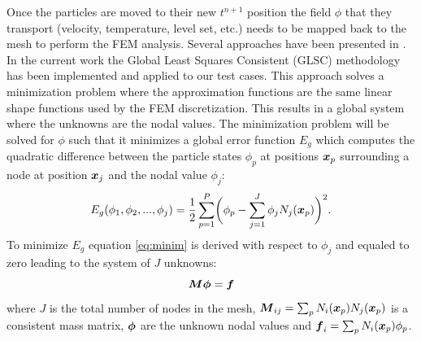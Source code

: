 Once the particles are moved to their new $t^{n+1}$ position the field $\phi$ that they transport (velocity, temperature, level set, etc.) needs to be mapped back to the mesh to perform the FEM analysis. Several approaches have been presented in \cite{gimenez:tesis}. In the current work the Global Least Squares Consistent (GLSC) methodology has been implemented and applied to our test cases. This approach solves a minimization problem where the approximation functions are the same linear shape functions used by the FEM discretization. This results in a global system where the unknowns are the nodal values. The minimization problem will be solved for $\phi$ such that it minimizes a global error function $E_g$ which computes the quadratic difference between the particle states $\phi_p$ at positions $\boldsymbol{x}_p$ surrounding a node at position $\boldsymbol{x}_j$ and the nodal value $\phi_j$:
%
\begin{equation}\label{eq:minim}
  E_g(\phi_1,\phi_2,...,\phi_j)=\frac{1}{2}\sum_{p=1}^P \biggl(\phi_p-\sum_{j=1}^J\phi_jN_j(\boldsymbol{x}_p)\biggr)^2.
\end{equation}
%
To minimize $E_g$ equation \ref{eq:minim} is derived with respect to $\phi_j$ and equaled to zero leading to the system of $J$ unknowns:
%
\begin{equation}\label{eq:mapptom}
  \boldsymbol{M}\boldsymbol{\phi}=\boldsymbol{f}
\end{equation}
%
where $J$ is the total number of nodes in the mesh, $\boldsymbol{M}_{ij}=\sum_pN_i(\boldsymbol{x}_p)N_j(\boldsymbol{x}_p)$ is a consistent mass matrix, $\boldsymbol{\phi}$ are the unknown nodal values and $\boldsymbol{f}_i=\sum_pN_i(\boldsymbol{x}_p)\phi_p$.

